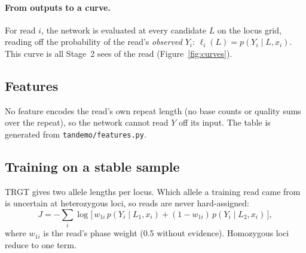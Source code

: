 \documentclass[10pt,a4paper]{article}
\begin{document}
\paragraph{From outputs to a curve.} For read $i$, the network is evaluated at every candidate $L$ on the locus
grid, reading off the probability of the read's \emph{observed} $Y_i$:
$\ell_i(L)=p(Y_i\mid L,x_i)$. This curve is all Stage~2 sees of the read (Figure~\ref{fig:curves}).

\subsection{Features}
No feature encodes the read's own repeat length (no base counts or quality sums over the repeat), so the network
cannot read $Y$ off its input. The table is generated from \texttt{tandemo/features.py}.

\begin{table}[H]
\centering\small

\caption{Inputs of Network~1. Missing values (e.g.\ no \texttt{np} tag) are filled with the training median before
standardisation. The medians, means and standard deviations are stored in the model file.}
\label{tab:features}
\end{table}

\subsection{Training on a stable sample}
TRGT gives two allele lengths per locus. Which allele a training read came from is uncertain at heterozygous loci,
so reads are never hard-assigned:
\[
J=-\sum_i\log\big[\,w_{1i}\,p(Y_i\mid L_1,x_i)+(1-w_{1i})\,p(Y_i\mid L_2,x_i)\,\big],
\]
where $w_{1i}$ is the read's phase weight (0.5 without evidence). Homozygous loci reduce to one term.
\end{document}
